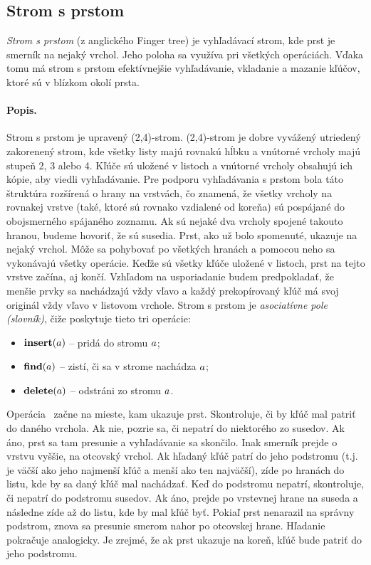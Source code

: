 \subsection{Strom s prstom}
\emph{Strom s prstom} (z anglického Finger tree) je vyhľadávací strom, kde prst je smerník na nejaký vrchol. Jeho poloha sa využíva pri všetkých operáciách. Vďaka tomu má strom s prstom efektívnejšie vyhľadávanie, vkladanie a mazanie kľúčov, ktoré sú v blízkom okolí prsta.

\paragraph{Popis.}
Strom s prstom je upravený (2,4)-strom. (2,4)-strom je dobre vyvážený utriedený zakorenený strom, kde všetky listy majú rovnakú hĺbku a vnútorné vrcholy majú stupeň 2, 3 alebo 4. Kľúče sú uložené v listoch a vnútorné vrcholy obsahujú ich kópie, aby viedli vyhľadávanie. Pre podporu vyhľadávania s prstom bola táto štruktúra rozšírená o hrany na vrstvách, čo znamená, že všetky vrcholy na rovnakej vrstve (také, ktoré sú rovnako vzdialené od koreňa) sú pospájané do obojsmerného spájaného zoznamu. Ak sú nejaké dva vrcholy spojené takouto hranou, budeme hovoriť, že sú susedia.
Prst, ako už bolo spomenuté, ukazuje na nejaký vrchol. Môže sa pohybovať po všetkých hranách a pomocou neho sa vykonávajú všetky operácie. Keďže sú všetky kľúče uložené v listoch, prst na tejto vrstve začína, aj končí.
Vzhľadom na usporiadanie budem predpokladať, že menšie prvky sa nachádzajú vždy vľavo a každý prekopírovaný kľúč má svoj originál vždy vľavo v listovom vrchole.
Strom s prstom je \emph{asociatívne pole (slovník)}, čiže
poskytuje tieto tri operácie:
\begin{itemize}
\item $\mathop{\mathbf{insert}}(a)$ -- pridá do stromu $a$;
\item $\mathop{\mathbf{find}}(a)$ -- zistí, či sa v strome nachádza $a$;
\item $\mathop{\mathbf{delete}}(a)$ -- odstráni zo stromu $a$.
\end{itemize}

Operácia \find\ začne na mieste, kam ukazuje prst. Skontroluje, či by kľúč mal patriť do daného vrchola. Ak nie, pozrie sa, či nepatrí do niektorého zo susedov. Ak áno, prst sa tam presunie a vyhľadávanie sa skončilo. Inak smerník prejde o vrstvu vyššie, na otcovský vrchol. Ak hľadaný kľúč patrí do jeho podstromu (t.j. je väčší ako jeho najmenší kľúč a menší ako ten najväčší), zíde po hranách do listu, kde by sa daný kľúč mal nachádzať. Keď do podstromu nepatrí, skontroluje, či nepatrí do podstromu susedov. Ak áno, prejde po vrstevnej hrane na suseda a následne zíde až do listu, kde by mal kľúč byť. Pokiaľ prst nenarazil na správny podstrom, znova sa presunie smerom nahor po otcovskej hrane. Hľadanie pokračuje analogicky. Je zrejmé, že ak prst ukazuje na koreň, kľúč bude patriť do jeho podstromu.

